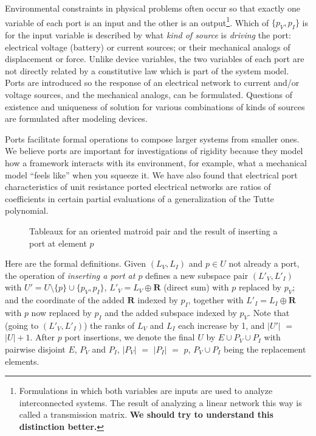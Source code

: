 \documentclass{amsproc-sunycstr}
\def\Reals{\ensuremath{\mathbf R}}
\theoremstyle{plain}
\theoremstyle{definition}
\theoremstyle{remark}
\newcommand{\extra}[1]{{{#1}}}
\begin{document}
Environmental constraints in physical problems often 
occur
so 
that exactly one variable of each port is an input and the other
is an output\footnote{
Formulations in which both variables are inputs are used to
analyze interconnected systems.  The result of 
analyzing a linear network this way is called a 
transmission matrix.  \textbf{We should try to understand 
this distinction better.}
}.  Which of $\{p_V,p_I\}$ is for the input variable
is described by what \textit{kind of source} is \textit{driving}
the port:  electrical voltage (battery) or current sources; or their
mechanical analogs of displacement or force.
\extra{Unlike device variables, the two variables of each port
are not directly related by a constitutive law which is 
part of the system model.}
Ports are introduced so the response of an electrical network to current 
and/or voltage sources, and the mechanical analogs, can be formulated.
\extra{Questions of existence and 
uniqueness of solution for various combinations of 
kinds of sources are formulated after 
modeling devices.}

\extra{ Ports 
facilitate formal operations to compose larger systems
from smaller ones.  We believe ports are important for investigations of
rigidity because they model how a framework interacts with its environment,
for example, what a mechanical model ``feels like'' when you squeeze it.
We have also found that electrical port characteristics of unit resistance
ported electrical networks are ratios of coefficients in certain 
partial evaluations 
of a generalization of the Tutte polynomial\cite{sdcPorted}.}

\begin{figure}

\caption{Tableaux for an oriented matroid pair and the result of 
inserting a port at element $p$}
\end{figure}



Here are the formal definitions.
Given $(L_V, L_I)$ and $p\in U$ not already a port, 
the 
operation of \textit{inserting a port at  $p$} 
defines a new subspace pair $(L'_V, L'_I)$
with $U'=U\setminus \{p\}\cup\{p_V,p_I\}$, $L'_V=L_V\oplus\Reals$ (direct 
sum) with $p$ replaced by $p_V$;
and the coordinate of the added $\mathbf{R}$ 
indexed by $p_I$, together with
$L'_I=L_I\oplus\Reals$ with $p$ now replaced by $p_I$
and the added subspace indexed by $p_V$.
\extra{Note that (going to $(L'_V, L'_I)$) the ranks of
$L_V$ and $L_I$ each increase by 1, and $|U'|$ $=$ $|U|+1$.}
\extra{After $p$ port
insertions, we denote the final $U$ by $E\cup P_V \cup P_I$ 
with pairwise disjoint
$E$, $P_V$ and $P_I$, $|P_V|$ $=$ $|P_I|$ $=$ $p$, $P_V\cup P_I$ being the 
replacement elements.}
\end{document}

